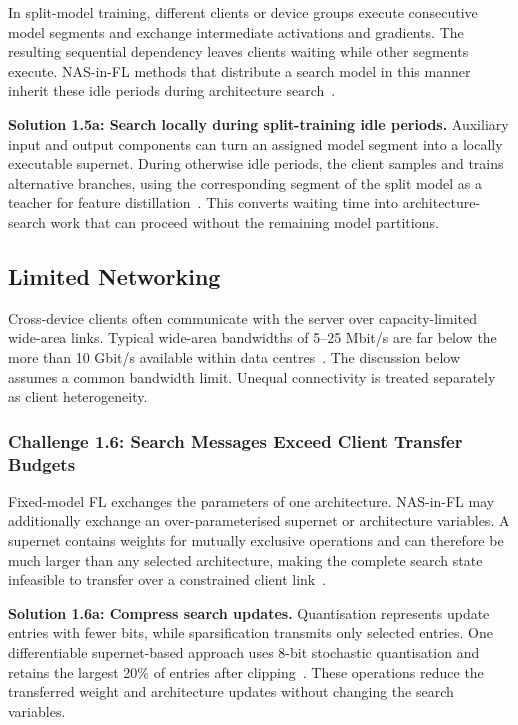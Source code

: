 In split-model training, different clients or device groups execute consecutive model segments and exchange intermediate activations and gradients. The resulting sequential dependency leaves clients waiting while other segments execute. NAS-in-FL methods that distribute a search model in this manner inherit these idle periods during architecture search~\cite{nasfly_2024}.

\noindent\textbf{Solution 1.5a: Search locally during split-training idle periods.} Auxiliary input and output components can turn an assigned model segment into a locally executable supernet. During otherwise idle periods, the client samples and trains alternative branches, using the corresponding segment of the split model as a teacher for feature distillation~\cite{nasfly_2024}. This converts waiting time into architecture-search work that can proceed without the remaining model partitions.

\subsection{Limited Networking} %

Cross-device clients often communicate with the server over capacity-limited wide-area links. Typical wide-area bandwidths of 5--25 Mbit/s are far below the more than 10 Gbit/s available within data centres~\cite{peaches_2024}. The discussion below assumes a common bandwidth limit. Unequal connectivity is treated separately as client heterogeneity.

\subsubsection{Challenge 1.6: Search Messages Exceed Client Transfer Budgets}

Fixed-model FL exchanges the parameters of one architecture. NAS-in-FL may additionally exchange an over-parameterised supernet or architecture variables. A supernet contains weights for mutually exclusive operations and can therefore be much larger than any selected architecture, making the complete search state infeasible to transfer over a constrained client link~\cite{fedoras_2022,hapfnas_2025}.

\noindent\textbf{Solution 1.6a: Compress search updates.} Quantisation represents update entries with fewer bits, while sparsification transmits only selected entries. One differentiable supernet-based approach uses 8-bit stochastic quantisation and retains the largest 20\% of entries after clipping~\cite{fedregnas_2025}. These operations reduce the transferred weight and architecture updates without changing the search variables.

